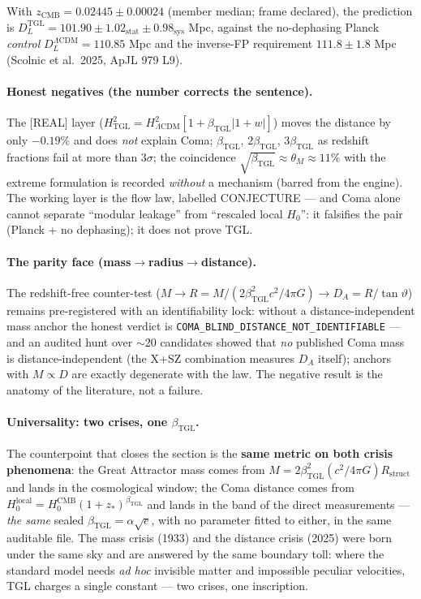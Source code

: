 \documentclass[11pt]{article}
\newcommand{\bTGL}{\beta_{\mathrm{TGL}}}\newcommand{\Msun}{M_{\odot}}\newcommand{\TGL}{\mathrm{TGL}}
\theoremstyle{definition}\newtheorem{deriv}{Derivation}
\begin{document}
With $z_{\mathrm{CMB}}=0.02445\pm0.00024$ (member median; frame declared), the prediction is $D_L^{\mathrm{TGL}}=101.90\pm1.02_{\mathrm{stat}}\pm0.98_{\mathrm{sys}}$ Mpc, against the no-dephasing Planck \emph{control} $D_L^{\Lambda\mathrm{CDM}}=110.85$ Mpc and the inverse-FP requirement $111.8\pm1.8$ Mpc (Scolnic et al.\ 2025, ApJL 979 L9).

\paragraph{Honest negatives (the number corrects the sentence).} The [REAL] layer ($H^2_{\mathrm{TGL}}=H^2_{\Lambda\mathrm{CDM}}[1+\bTGL|1+w|]$) moves the distance by only $-0.19\%$ and does \emph{not} explain Coma; $\bTGL$, $2\bTGL$, $3\bTGL$ as redshift fractions fail at more than $3\sigma$; the coincidence $\sqrt{\bTGL}\approx\theta_M\approx11\%$ with the extreme formulation is recorded \emph{without} a mechanism (barred from the engine). The working layer is the flow law, labelled \textsf{CONJECTURE} --- and Coma alone cannot separate ``modular leakage'' from ``rescaled local $H_0$'': it falsifies the pair (Planck + no dephasing); it does not prove TGL.

\paragraph{The parity face (mass$\to$radius$\to$distance).} The redshift-free counter-test ($M\to R=M/(2\bTGL^2 c^2/4\pi G)\to D_A=R/\tan\vartheta$) remains pre-registered with an identifiability lock: without a distance-independent mass anchor the honest verdict is \texttt{COMA\_BLIND\_DISTANCE\_NOT\_IDENTIFIABLE} --- and an audited hunt over $\sim$20 candidates showed that \emph{no} published Coma mass is distance-independent (the X+SZ combination measures $D_A$ itself); anchors with $M\propto D$ are exactly degenerate with the law. The negative result is the anatomy of the literature, not a failure.

\paragraph{Universality: two crises, one $\bTGL$.} The counterpoint that closes the section is the \textbf{same metric on both crisis phenomena}: the Great Attractor mass comes from $M=2\bTGL^2(c^2/4\pi G)R_{\mathrm{struct}}$ and lands in the cosmological window; the Coma distance comes from $H_0^{\mathrm{local}}=H_0^{\mathrm{CMB}}(1+z_*)^{\bTGL}$ and lands in the band of the direct measurements --- \emph{the same} sealed $\bTGL=\alpha\sqrt e$, with no parameter fitted to either, in the same auditable file. The mass crisis (1933) and the distance crisis (2025) were born under the same sky and are answered by the same boundary toll: where the standard model needs \emph{ad hoc} invisible matter and impossible peculiar velocities, TGL charges a single constant --- two crises, one inscription.
\end{document}
